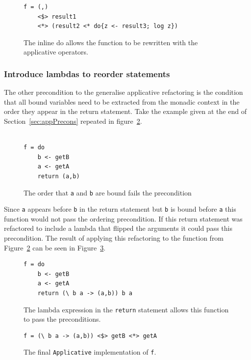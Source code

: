 \begin{figure}[t]
\begin{lstlisting}
f = (,) 
    <$> result1 
    <*> (result2 <* do{z <- result3; log z})
\end{lstlisting}
\caption{The inline do allows the function to be rewritten with the applicative operators.}
\label{inlineDo_ref}
\end{figure}

\subsubsection{Introduce lambdas to reorder statements}
\label{lambdaIntro}

The other precondition to the generalise applicative refactoring is the condition that all bound variables need to be extracted from the monadic context in the order they appear in the return statement. Take the example given at the end of Section~\ref{sec:appPrecons} repeated in figure~\ref{ordering}.

\begin{figure}[t]
\begin{lstlisting}

f = do
	b <- getB
	a <- getA
	return (a,b)
\end{lstlisting} 
\caption{The order that \texttt{a} and \texttt{b} are bound fails the precondition}
\label{ordering}
\end{figure}


Since \texttt{a} appears before \texttt{b} in the return statement but \texttt{b} is bound before \texttt{a} this function would not pass the ordering precondition. If this return statement was refactored to include a lambda that flipped the arguments it could pass this precondition. The result of applying this refactoring to the function from Figure~\ref{ordering} can be seen in Figure~\ref{reordered}.

\begin{figure}[t]
\begin{lstlisting}
f = do
	b <- getB
	a <- getA
	return (\ b a -> (a,b)) b a
\end{lstlisting}
\caption{The lambda expression in the \texttt{return} statement allows this function to pass the preconditions.}
\label{reordered}
\end{figure}

\begin{figure}[t]
\begin{lstlisting}
f = (\ b a -> (a,b)) <$> getB <*> getA
\end{lstlisting}
\caption{The final \texttt{Applicative} implementation of \texttt{f}.}
\label{finalF}
\end{figure}

